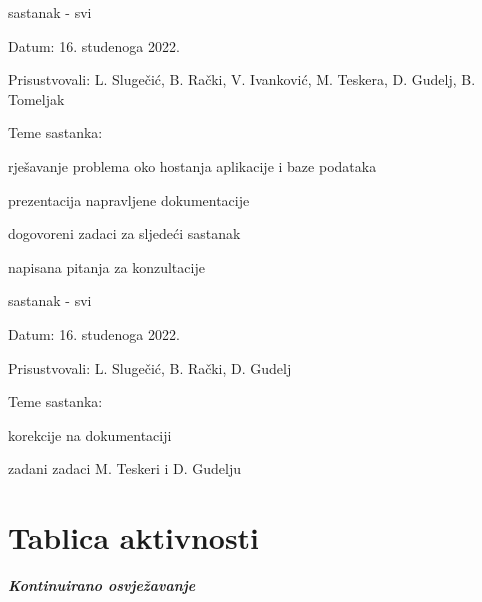 \begin{packed_enum}
			\item  sastanak - svi
			\item[] \begin{packed_item}
				\item Datum: 16. studenoga 2022.
				\item Prisustvovali: 
                L. Slugečić, B. Rački, V. Ivanković, M. Teskera, D. Gudelj, B. Tomeljak
				\item Teme sastanka:
				\begin{packed_item}
					\item 
                    rješavanje problema oko hostanja aplikacije i baze podataka
					\item 
                    prezentacija napravljene dokumentacije
                    \item
                    dogovoreni zadaci za sljedeći sastanak
                    \item
                    napisana pitanja za konzultacije
				
				\end{packed_item}
			\end{packed_item}
			
			\item  sastanak - svi
			\item[] \begin{packed_item}
				\item Datum: 16. studenoga 2022.
				\item Prisustvovali: 
                L. Slugečić, B. Rački, D. Gudelj
				\item Teme sastanka:
				\begin{packed_item}
					\item 
                    korekcije na dokumentaciji 
                    \item
                    zadani zadaci M. Teskeri i D. Gudelju
				
				\end{packed_item}
			\end{packed_item}
			
		\end{packed_enum}
		
		\eject
		\section*{Tablica aktivnosti}
		
			\textbf{\textit{Kontinuirano osvježavanje}}\\
			
